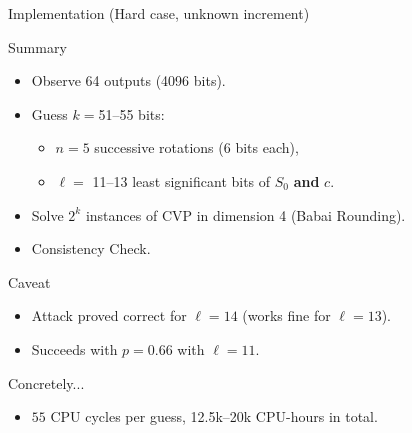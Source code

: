 \begin{frame}[label=bragging]{Implementation (Hard case, unknown increment)}
  \begin{block}{Summary}
    \begin{itemize}
    \item Observe 64 outputs (4096 bits).
    \item Guess $k=$51--55 bits:
      \begin{itemize}
      \item $n=5$ successive rotations (6 bits each),
      \item $\ell=$ 11--13 least significant bits of \(S_0\) \textbf{and} \alert{$c$}.
      \end{itemize}
    \item Solve \(2^{k}\) instances of CVP in dimension 4 (Babai Rounding).
    \item Consistency Check.
    \end{itemize}
  \end{block}

  \begin{alertblock}{Caveat}
    \begin{itemize}
    \item Attack proved correct for $\ell=14$ (works fine for $\ell=13$).
    \item Succeeds with $p=0.66$ with $\ell=11$.
    \end{itemize}
  \end{alertblock}
  
  \begin{exampleblock}{Concretely...}
    \begin{itemize}
    \item $55$ CPU cycles per guess, 12.5k--20k CPU-hours in total.
    \end{itemize}
  \end{exampleblock}
\end{frame}


